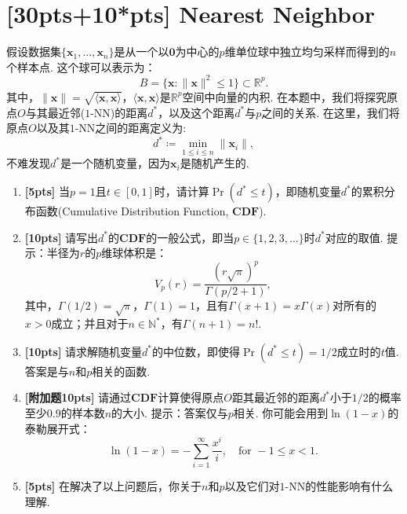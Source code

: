 \documentclass[a4paper,UTF8]{article}
\numberwithin{equation}{section}
\begin{document}
\section{[30pts+10*pts] Nearest Neighbor}
假设数据集$\{\mathbf{x}_1,...,\mathbf{x}_n\}$是从一个以$\mathbf{0}$为中心的$p$维单位球中独立均匀采样而得到的$n$个样本点. 这个球可以表示为：
\begin{equation}
	B = \{\mathbf{x}: \lVert \mathbf{x} \rVert^2 \leq 1\} \subset \mathbb{R}^p.
\end{equation}
其中，$\lVert \mathbf{x} \rVert= \sqrt{\langle\mathbf{x}, \mathbf{x}\rangle}$，$\langle\mathbf{x}, \mathbf{x}\rangle$是$\mathbb{R}^p$空间中向量的内积.
在本题中，我们将探究原点$O$与其最近邻($1$-NN)的距离$d^*$，以及这个距离$d^*$与$p$之间的关系. 在这里，我们将原点$O$以及其$1$-NN之间的距离定义为:
\begin{equation}
d^* \coloneqq \min_{1\leq i \leq n} \lVert \mathbf{x}_i \rVert,
\end{equation}
不难发现$d^*$是一个随机变量，因为$\mathbf{x}_i$是随机产生的.
\begin{enumerate}[(1)]
\item \textbf{[5pts]} 当$p=1$且$t\in [0,1]$时，请计算$\Pr(d^*\leq t)$，即随机变量$d^*$的累积分布函数(Cumulative Distribution Function, $\mathbf{CDF}$).
\item \textbf{[10pts]} 请写出$d^*$的$\mathbf{CDF}$的一般公式，即当$p\in\{1,2,3,...\}$时$d^*$对应的取值. 提示：半径为$r$的$p$维球体积是：
	\begin{equation}
	V_p(r)=\frac{(r\sqrt{\pi})^p}{\Gamma(p/2+1)},
	\end{equation}
	其中，$\Gamma(1/2)=\sqrt{\pi}$，$\Gamma(1)=1$，且有$\Gamma(x+1)=x\Gamma(x)$对所有的$x>0$成立；并且对于$n\in\mathbb{N}^*$，有$\Gamma(n+1)=n!$.
\item \textbf{[10pts]} 请求解随机变量$d^*$的中位数，即使得$\Pr(d^*\leq t)=1/2$成立时的$t$值. 答案是与$n$和$p$相关的函数.

\item \textbf{[附加题10pts]} 请通过$\mathbf{CDF}$计算使得原点$O$距其最近邻的距离$d^*$小于$1/2$的概率至少$0.9$的样本数$n$的大小. 提示：答案仅与$p$相关. 你可能会用到$\ln(1-x)$的泰勒展开式：
\begin{equation}
\ln(1-x) = - \sum_{i=1}^{\infty} \frac{x^i}{i}, \quad \mbox{for } -1 \leq x < 1.
\end{equation}
\item \textbf{[5pts]} 在解决了以上问题后，你关于$n$和$p$以及它们对$1$-NN的性能影响有什么理解.
\end{enumerate}
\end{document}
